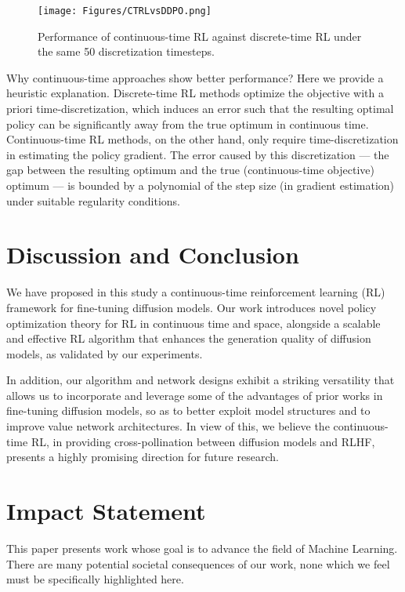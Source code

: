 \documentclass{article}
\theoremstyle{plain}
\theoremstyle{definition}
\theoremstyle{remark}
\begin{document}
\begin{figure}[!h]
    \centering
    \texttt{[image: Figures/CTRLvsDDPO.png]}
    \caption{Performance of continuous-time RL against discrete-time RL under the same 50 discretization timesteps.}
    \label{Fig:CTRLvsDDPO.png}
    \vspace{-10 pt}
\end{figure}
Why continuous-time approaches show better performance? 
Here we provide a heuristic explanation. Discrete-time RL methods optimize the objective with a priori time-discretization, which induces an error such that the resulting optimal policy can be significantly away from the true optimum in continuous time. 
Continuous-time RL methods, on the other hand, only require time-discretization in estimating the policy gradient. The error caused by this discretization --- the gap between the resulting optimum and the true (continuous-time objective) optimum --- is bounded by a polynomial of the step size (in gradient estimation) under suitable regularity conditions.


\section{Discussion and Conclusion}
\label{sc6}

We have proposed in this study a continuous-time reinforcement learning (RL) framework for fine-tuning diffusion models. Our work introduces novel policy optimization theory for RL in continuous time and space, alongside a scalable and effective RL algorithm that enhances the generation quality of diffusion models, as validated by our experiments.  

In addition, our algorithm and network designs exhibit a striking versatility that allows us to incorporate and leverage some of the advantages of prior works in fine-tuning diffusion models, so as to better exploit model structures  and to improve value network architectures. In view of this, we believe the continuous-time RL, in providing cross-pollination between diffusion models and RLHF, presents a highly promising direction for future research. 

\section*{Impact Statement}
This paper presents work whose goal is to advance the field of 
Machine Learning. There are many potential societal consequences 
of our work, none which we feel must be specifically highlighted here.
\end{document}
